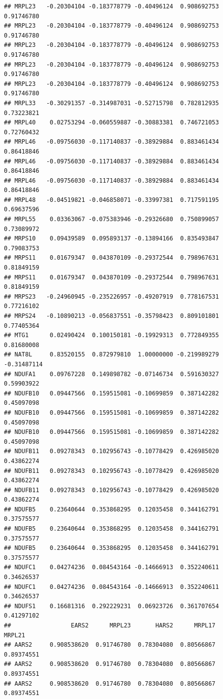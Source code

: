 \documentclass[
]{article}
\begin{document}
\begin{verbatim}
## MRPL23   -0.20304104 -0.183778779 -0.40496124  0.908692753  0.91746780
## MRPL23   -0.20304104 -0.183778779 -0.40496124  0.908692753  0.91746780
## MRPL23   -0.20304104 -0.183778779 -0.40496124  0.908692753  0.91746780
## MRPL23   -0.20304104 -0.183778779 -0.40496124  0.908692753  0.91746780
## MRPL23   -0.20304104 -0.183778779 -0.40496124  0.908692753  0.91746780
## MRPL33   -0.30291357 -0.314987031 -0.52715798  0.782812935  0.73223821
## MRPL40    0.02753294 -0.060559887 -0.30883381  0.746721053  0.72760432
## MRPL46   -0.09756030 -0.117140837 -0.38929884  0.883461434  0.86418846
## MRPL46   -0.09756030 -0.117140837 -0.38929884  0.883461434  0.86418846
## MRPL46   -0.09756030 -0.117140837 -0.38929884  0.883461434  0.86418846
## MRPL48   -0.04519821 -0.046858071 -0.33997381  0.717591195  0.69637596
## MRPL55    0.03363067 -0.075383946 -0.29326680  0.750899057  0.73089972
## MRPS10    0.09439589  0.095893137 -0.13894166  0.835493847  0.79083753
## MRPS11    0.01679347  0.043870109 -0.29372544  0.798967631  0.81849159
## MRPS11    0.01679347  0.043870109 -0.29372544  0.798967631  0.81849159
## MRPS23   -0.24960945 -0.235226957 -0.49207919  0.778167531  0.77216102
## MRPS24   -0.10890213 -0.056837551 -0.35798423  0.809101801  0.77405364
## MTG1      0.02490424  0.100150181 -0.19929313  0.772849355  0.81680008
## NAT8L     0.83520155  0.872979810  1.00000000 -0.219989279 -0.31487114
## NDUFA1    0.09767228  0.149898782 -0.07146734  0.591630327  0.59903922
## NDUFB10   0.09447566  0.159515081 -0.10699859  0.387142282  0.45097098
## NDUFB10   0.09447566  0.159515081 -0.10699859  0.387142282  0.45097098
## NDUFB10   0.09447566  0.159515081 -0.10699859  0.387142282  0.45097098
## NDUFB11   0.09278343  0.102956743 -0.10778429  0.426985020  0.43862274
## NDUFB11   0.09278343  0.102956743 -0.10778429  0.426985020  0.43862274
## NDUFB11   0.09278343  0.102956743 -0.10778429  0.426985020  0.43862274
## NDUFB5    0.23640644  0.353868295  0.12035458  0.344162791  0.37575577
## NDUFB5    0.23640644  0.353868295  0.12035458  0.344162791  0.37575577
## NDUFB5    0.23640644  0.353868295  0.12035458  0.344162791  0.37575577
## NDUFC1    0.04274236  0.084543164 -0.14666913  0.352240611  0.34626537
## NDUFC1    0.04274236  0.084543164 -0.14666913  0.352240611  0.34626537
## NDUFS1    0.16681316  0.292229231  0.06923726  0.361707654  0.41297102
##                 EARS2      MRPL23       HARS2      MRPL17      MRPL21
## AARS2     0.908538620  0.91746780  0.78304080  0.80566867  0.89374551
## AARS2     0.908538620  0.91746780  0.78304080  0.80566867  0.89374551
## AARS2     0.908538620  0.91746780  0.78304080  0.80566867  0.89374551

\end{verbatim}
\end{document}
